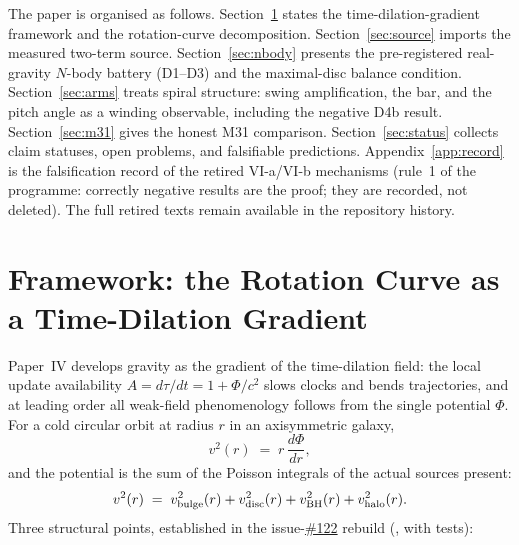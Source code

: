 \documentclass[11pt,a4paper]{article}
\providecommand{\ssvfile}[1]{\hyperref[file:#1]{\texttt{\detokenize{#1}}}}
\providecommand{\ssvissue}[1]{\hyperref[issue:#1]{\##1}}
\begin{document}
The paper is organised as follows.  Section~\ref{sec:framework} states
the time-dilation-gradient framework and the rotation-curve
decomposition.  Section~\ref{sec:source} imports the measured two-term
source.  Section~\ref{sec:nbody} presents the pre-registered real-gravity
$N$-body battery (D1--D3) and the maximal-disc balance condition.
Section~\ref{sec:arms} treats spiral structure: swing amplification,
the bar, and the pitch angle as a winding observable, including the
negative D4b result.  Section~\ref{sec:m31} gives the honest M31
comparison.  Section~\ref{sec:status} collects claim statuses, open
problems, and falsifiable predictions.  Appendix~\ref{app:record} is the
falsification record of the retired VI-a/VI-b mechanisms (rule~1 of the
programme: correctly negative results are the proof; they are recorded,
not deleted).  The full retired texts remain available in the repository
history.

\section{Framework: the Rotation Curve as a Time-Dilation Gradient}
\label{sec:framework}

Paper~IV develops gravity as the gradient of the time-dilation field: the
local update availability $A = d\tau/dt = 1 + \Phi/c^2$ slows clocks and
bends trajectories, and at leading order all weak-field phenomenology
follows from the single potential $\Phi$.  For a cold circular orbit at
radius $r$ in an axisymmetric galaxy,
\begin{equation}
  v^2(r) \;=\; r\,\frac{d\Phi}{dr},
  \label{eq:vcirc}
\end{equation}
and the potential is the sum of the Poisson integrals of the actual
sources present:
\begin{equation}
  v^2(r) \;=\; v^2_{\rm bulge}(r) + v^2_{\rm disc}(r)
             + v^2_{\rm BH}(r) + v^2_{\rm halo}(r).
  \label{eq:decomposition}
\end{equation}
Three structural points, established in the issue-\ssvissue{122} rebuild
(\ssvfile{rotation_curve_timedilation}, with tests):
\end{document}
